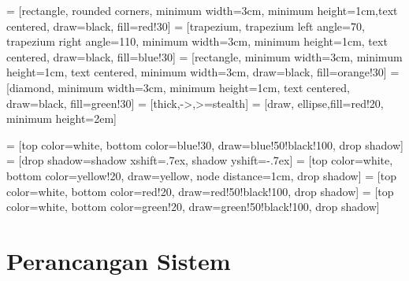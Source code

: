  = [rectangle, rounded corners, minimum width=3cm, minimum height=1cm,text centered, draw=black, fill=red!30]
 = [trapezium, trapezium left angle=70, trapezium right angle=110, minimum width=3cm, minimum height=1cm, text centered, draw=black, fill=blue!30]
 = [rectangle, minimum width=3cm, minimum height=1cm, text centered, minimum width=3cm, draw=black, fill=orange!30]
 = [diamond, minimum width=3cm, minimum height=1cm, text centered, draw=black, fill=green!30]
 = [thick,->,>=stealth]
 = [draw, ellipse,fill=red!20, minimum height=2em]

\usetikzlibrary{positioning}
\usetikzlibrary{shadows}

 = [top color=white, bottom color=blue!30, draw=blue!50!black!100, drop shadow]
 = [drop shadow={shadow xshift=.7ex, shadow yshift=-.7ex}]
 = [top color=white, bottom color=yellow!20, draw=yellow, node distance=1cm, drop shadow]
 = [top color=white, bottom color=red!20, draw=red!50!black!100, drop shadow]
 = [top color=white, bottom color=green!20, draw=green!50!black!100, drop shadow]


\chapter{Perancangan Sistem}


